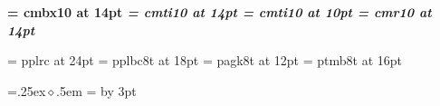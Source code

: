 \def\name{Edward Ross}
\def\addrone{}
\def\addrtwo{}
\def\github{github.com/EdwardJRoss/}
\def\phone{0403 995 808}
\def\email{edward@skeptric.com}
\def\website{https://skeptric.com}

\font\bf = cmbx10 at 14pt
\font\it = cmti10 at 14pt
\font\smallit = cmti10 at 10pt
\font\rm = cmr10 at 14pt

\def\nameReference#1{{\it #1}}

\font\titleFont = pplrc at 24pt
\font\headFont = pplbc8t at 18pt
\font\infoFont = pagk8t at 12pt
\font\sectionFont = ptmb8t at 16pt


\parskip=0pt
\parindent=0pt

\def\head#1{\vskip2pt\hfil\headFont #1\hfill\vskip3pt}

\def\startSkill{\relax}
\def\skill#1{\rm {\vskip20pt {\sectionFont #1}}\vskip6pt}
\def\endSkill{\relax}

\def\bullet{\leavevmode\raise .25ex\hbox{$\diamond$}\kern.5em}
\newdimen\bulletSize
{}=\hbox{\bullet}
\bulletSize=
\advance\bulletSize by 3pt
\def\expTitle#1{\rm{\sectionFont #1}\par\nobreak}
\def\expRole#1#2{\vskip1pt\nobreak #2 \hfill {#1}\par\nobreak}
\def\expContent{\vskip3.5pt\nobreak\leftskip=0mm\parskip=1pt}
\def\startExp#1#2#3{\expTitle{#1}\expRole{#2}{#3}\expContent}
\def\exp#1{\hangindent=\bulletSize\hangafter=1%
\vskip1pt
\bullet #1 \par}
\def\endExp{\leftskip=0mm\parskip=0mm\vskip16pt}

\def\description#1{{\rm #1}}


\def\skilljump{\vskip2mm}


\def\pageHead{\hfil {\titleFont\name} \hfil
\vskip 3pt
\hrule
\vskip 5pt
{\infoFont\phone} \hfill {\infoFont\markupEmail{\email}}\par
{\infoFont\github} \hfill {\infoFont\website}\par
\vskip 2pt}


